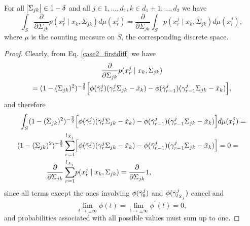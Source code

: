 \begin{lemma}\label{interchange_caseII_firstdif}
    For all $\abs{\Sigma_{jk}} \in 1-\delta$ and all $j \in 1, \dots, d_1, k\in d_1 +1, \dots, d_2$ we have
    \begin{equation*}
        \int_S \frac{\partial }{\partial \Sigma_{jk}} p(x^j_{r} \mid x_{k}, \Sigma_{jk}) d\mu(x_r^j)= \frac{\partial }{\partial \Sigma_{jk}} \int_S p(x^j_{r} \mid x_{k}, \Sigma_{jk}) d\mu(x_r^j),
    \end{equation*}
    where $\mu$ is the counting measure on $S$, the corresponding discrete space.
    
    \begin{proof}
        Clearly, from Eq. \eqref{case2_firstdiff} we have 
        \begin{multline*}
            \frac{\partial }{\partial \Sigma_{jk}} p(x^j_{r} \mid x_{k}, \Sigma_{jk}) \\
            =  (1-(\Sigma_{jk})^2)^{-\frac{3}{2}}\Big[\phi({\Tilde{\gamma}}^j_{r})({\gamma}^j_r\Sigma_{jk} - {\Tilde{x}}_{k}) - \phi({\Tilde{\gamma}}^j_{r-1})({\gamma}^j_{r-1}\Sigma_{jk} - {\Tilde{x}}_{k})\Big],
        \end{multline*}
        and therefore 
        \begin{equation*}
            \begin{split}
                \int_S (1-(\Sigma_{jk})^2)^{-\frac{3}{2}}&\Big[\phi({\Tilde{\gamma}}^j_{r})({\gamma}^j_r\Sigma_{jk} - {\Tilde{x}}_{k}) - \phi({\Tilde{\gamma}}^j_{r-1})({\gamma}^j_{r-1}\Sigma_{jk} - {\Tilde{x}}_{k})\Big] d\mu(x_r^j) = \\
                (1-(\Sigma_{jk})^2)^{-\frac{3}{2}} \sum_{r=1}^{l_{X_j}} &\Big[\phi({\Tilde{\gamma}}^j_{r})({\gamma}^j_r\Sigma_{jk} - {\Tilde{x}}_{k}) - \phi({\Tilde{\gamma}}^j_{r-1})({\gamma}^j_{r-1}\Sigma_{jk} - {\Tilde{x}}_{k})\Big] = 0 = \\
                \frac{\partial }{\partial \Sigma_{jk}} \sum_{r=1}^{l_{X_j}} &p(x^j_{r} \mid x_{k}, \Sigma_{jk}) = \frac{\partial }{\partial \Sigma_{jk}} 1,
            \end{split}
        \end{equation*}
        since all terms except the ones involving $\phi({\Tilde{\gamma}}^j_{0})$ and $\phi({\Tilde{\gamma}}^j_{l_{X_j}})$ cancel and 
        \begin{equation*}
            \lim\limits_{t \to \pm \infty} \phi(t) = \lim\limits_{t \to \pm \infty} \phi^\prime(t) = 0,
        \end{equation*} 
        and probabilities associated with all possible values must sum up to one. 
    \end{proof}
\end{lemma}


